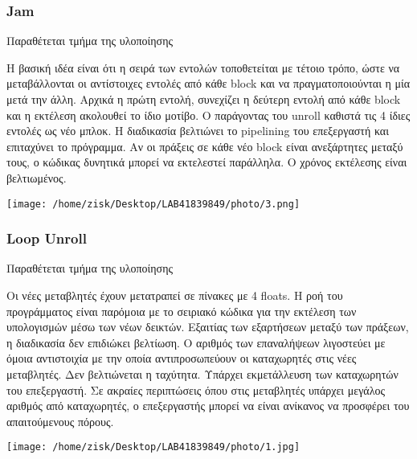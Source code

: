 \documentclass[11pt]{article}
\begin{document}
\vspace{60mm}
\subsubsection{Jam}
Παραθέτεται τμήμα της υλοποίησης\\

\begin{multicols}{2}
H βασική ιδέα είναι ότι η σειρά των εντολών τοποθετείται με τέτοιο τρόπο, ώστε να μεταβάλλονται οι αντίστοιχες εντολές από κάθε block  και να πραγματοποιούνται η μία μετά την άλλη. Αρχικά η πρώτη εντολή, συνεχίζει η δεύτερη εντολή από κάθε block και η εκτέλεση ακολουθεί το ίδιο μοτίβο. Ο παράγοντας του unroll  καθιστά τις 4 ίδιες εντολές ως νέο μπλοκ. Η διαδικασία βελτιώνει το pipelining του επεξεργαστή και επιταχύνει το πρόγραμμα. Αν οι πράξεις σε κάθε νέο block είναι ανεξάρτητες μεταξύ τους, ο κώδικας δυνητικά μπορεί να εκτελεστεί παράλληλα. Ο χρόνος εκτέλεσης είναι βελτιωμένος.

  \null \vfill
 
  \vfill \null

\columnbreak
 
  \texttt{[image: /home/zisk/Desktop/LAB41839849/photo/3.png]}
  \null \vfill
  
  \vfill \null
\end{multicols}

\vspace{70mm}
\subsubsection{Loop Unroll}


Παραθέτεται τμήμα της υλοποίησης\\
\begin{multicols}{2}
Οι νέες μεταβλητές έχουν μετατραπεί σε πίνακες με 4 floats. Η ροή του προγράμματος είναι παρόμοια με το σειριακό κώδικα για την εκτέλεση των υπολογισμών
μέσω των νέων δεικτών. Εξαιτίας των εξαρτήσεων μεταξύ των πράξεων, η διαδικασία δεν επιδιώκει βελτίωση. Ο αριθμός των επαναλήψεων λιγοστεύει με όμοια αντιστοιχία με την οποία αντιπροσωπεύουν οι καταχωρητές στις νέες μεταβλητές. Δεν βελτιώνεται η ταχύτητα. Υπάρχει εκμετάλλευση των καταχωρητών του επεξεργαστή. Σε ακραίες περιπτώσεις όπου στις μεταβλητές υπάρχει μεγάλος αριθμός από καταχωρητές, ο επεξεργαστής μπορεί να είναι ανίκανος να προσφέρει του απαιτούμενους πόρους.
  \null \vfill

  \vfill \null

\columnbreak
\texttt{[image: /home/zisk/Desktop/LAB41839849/photo/1.jpg]}
  \null \vfill
  
  \vfill \null
\end{multicols}
\end{document}
